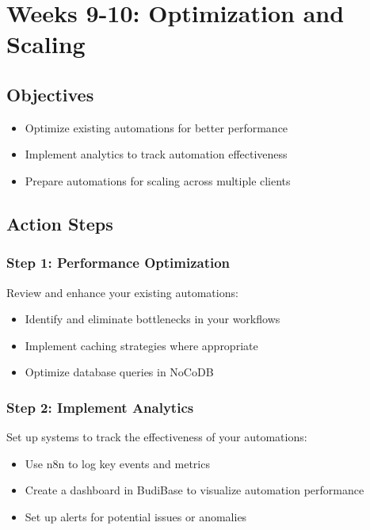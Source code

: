\section{Weeks 9-10: Optimization and Scaling}

\subsection{Objectives}
\begin{itemize}
    \item Optimize existing automations for better performance
    \item Implement analytics to track automation effectiveness
    \item Prepare automations for scaling across multiple clients
\end{itemize}

\subsection{Action Steps}

\subsubsection{Step 1: Performance Optimization}
Review and enhance your existing automations:

\begin{itemize}
    \item Identify and eliminate bottlenecks in your workflows
    \item Implement caching strategies where appropriate
    \item Optimize database queries in NoCoDB
\end{itemize}

\subsubsection{Step 2: Implement Analytics}
Set up systems to track the effectiveness of your automations:

\begin{itemize}
    \item Use n8n to log key events and metrics
    \item Create a dashboard in BudiBase to visualize automation performance
    \item Set up alerts for potential issues or anomalies
\end{itemize}

